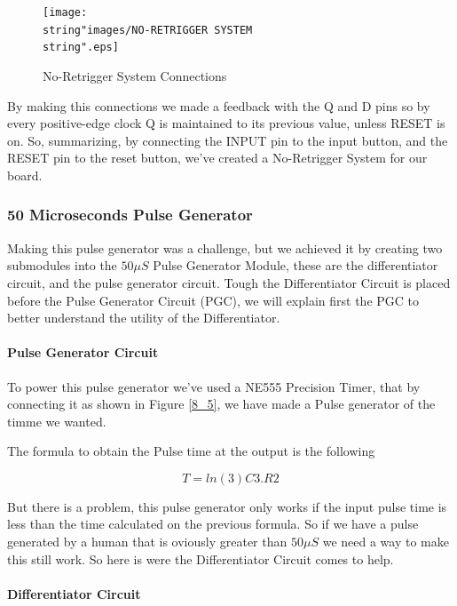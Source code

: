 \begin{figure}[H]
\begin{centering}
\texttt{[image: \\string"images/NO-RETRIGGER SYSTEM\\string".eps]}
\par\end{centering}
\caption{No-Retrigger System Connections}

\end{figure}

By making this connections we made a feedback with the Q and D pins
so by every positive-edge clock Q is maintained to its previous value,
unless RESET is on. So, summarizing, by connecting the INPUT pin to
the input button, and the RESET pin to the reset button, we've created
a No-Retrigger System for our board.

\subsubsection{50 Microseconds Pulse Generator}

Making this pulse generator was a challenge, but we achieved it by
creating two submodules into the $50\mu S$ Pulse Generator Module,
these are the differentiator circuit, and the pulse generator circuit.
Tough the Differentiator Circuit is placed before the Pulse Generator
Circuit (PGC), we will explain first the PGC to better understand
the utility of the Differentiator.

\paragraph{Pulse Generator Circuit}

To power this pulse generator we've used a NE555 Precision Timer,
that by connecting it as shown in Figure \ref{8_5}, we have made
a Pulse generator of the timme we wanted.

The formula to obtain the Pulse time at the output is the following

\[
T=ln(3)C3.R2
\]

But there is a problem, this pulse generator only works if the input
pulse time is less than the time calculated on the previous formula.
So if we have a pulse generated by a human that is oviously greater
than $50\mu S$ we need a way to make this still work. So here is
were the Differentiator Circuit comes to help.

\paragraph{Differentiator Circuit}

